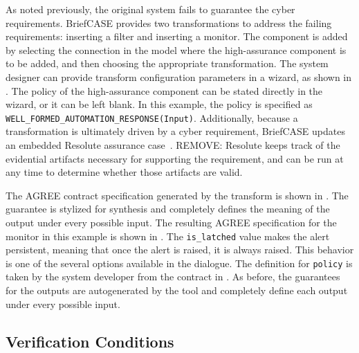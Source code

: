 As noted previously, the original system fails to guarantee the cyber requirements.
BriefCASE provides two transformations to address the failing requirements: inserting a filter and inserting a monitor.
The component is added by selecting the connection in the model where the high-assurance component is to be added, and then choosing the appropriate transformation.
The system designer can provide transform configuration parameters in a wizard, as shown in .
The policy of the high-assurance component can be stated directly in the wizard, or it can be left blank.
In this example, the policy is specified as \texttt{WELL\_FORMED\_AUTOMATION\_RESPONSE(Input)}.
Additionally, because a transformation is ultimately driven by a cyber requirement, BriefCASE updates an embedded Resolute assurance case~\cite{resolute-destion}.
REMOVE: Resolute keeps track of the evidential artifacts necessary for supporting the requirement, and can be run at any time to determine whether those artifacts are valid.

The AGREE contract specification generated by the transform is shown in .
The guarantee is stylized for synthesis and completely defines the meaning of the output under every possible input.
The resulting AGREE specification for the monitor in this example is shown in .
The \texttt{is\_latched} value makes the alert persistent, meaning that once the alert is raised, it is always raised.
This behavior is one of the several options available in the dialogue.
The definition for \texttt{policy} is taken by the system developer from the contract in .
As before, the guarantees for the outputs are autogenerated by the tool and completely define each output under every possible input.

\subsection{Verification Conditions}

